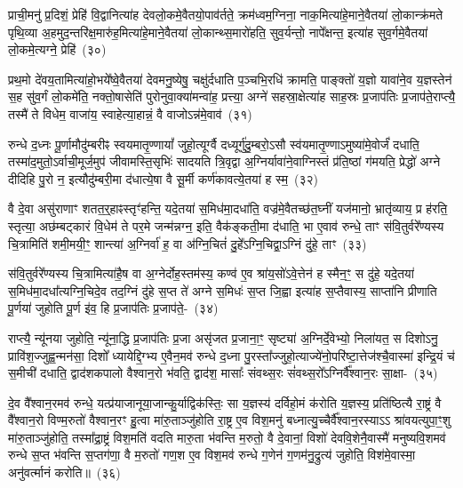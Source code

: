 {\anuvakamend[{प्रा॒णैः पोषो᳚\-ऽप्र॒त्याग्नी᳚ध्रे॒ पति॑मे॒ष दश॑ च}]}

प्राची॒मनु॑ प्र॒दिशं॒ प्रेहि॑ वि॒द्वानित्या॑ह देवलो॒कमे॒वैतयो॒पाव॑र्तते॒ क्रम॑ध्वम॒ग्निना॒ नाक॒मित्या॑हे॒माने॒वैतया॑ लो॒कान्क्र॑मते पृथि॒व्या अ॒हमुद॒न्तरि॑क्ष॒मारु॑ह॒मित्या॑हे॒माने॒वैतया॑ लो॒कान्थ्स॒मारो॑हति॒ सुव॒र्यन्तो॒ नापे᳚क्षन्त॒ इत्या॑ह सुव॒र्गमे॒वैतया॑ लो॒कमे॒त्यग्ने॒ प्रेहि॑~(३०)\ip

प्रथ॒मो दे॑वय॒तामित्या॑हो॒भये᳚ष्वे॒वैतया॑ देवमनु॒ष्येषु॒ चक्षु॑र्दधाति प॒ञ्चभि॒रधि॑ क्रामति॒ पाङ्क्तो॑ य॒ज्ञो यावा॑ने॒व य॒ज्ञस्तेन॑ स॒ह सु॑व॒र्गं लो॒कमे॑ति॒ नक्तो॒षासेति॑ पुरोनुवा॒क्या॑मन्वा॑ह॒ प्रत्त्या॒ अग्ने॑ सहस्रा॒क्षेत्या॑ह साह॒स्रः प्र॒जा\-प॑तिः प्र॒जा\-प॑ते॒राप्त्यै॒ तस्मै॑ ते विधेम॒ वाजा॑य॒ स्वाहेत्या॒हान्नं॒ वै वाजो\-ऽन्न॑मे॒वाव॑~(३१)\ip

रुन्धे द॒ध्नः पू॒र्णामौदु॑म्बरीꣴ स्वयमा\-तृ॒ण्णायां᳚ जुहो॒त्यूर्ग्वै दध्यूर्गु॑दु॒म्बरो॒\-ऽसौ स्व॑यमातृ॒ण्णा\-ऽमुष्या॑मे॒वोर्जं॑ दधाति॒ तस्मा॑द॒मुतो॒\-ऽर्वाची॒मूर्ज॒मुप॑ जीवामस्ति॒सृभिः॑ सादयति त्रि॒वृद्वा अ॒ग्निर्यावा॑ने॒वाग्निस्तं प्र॑ति॒ष्ठां ग॑मयति॒ प्रेद्धो॑ अग्ने दीदिहि पु॒रो न॒ इत्यौदु॑म्बरी॒मा द॑धात्ये॒षा वै सू॒र्मी कर्ण॑कावत्ये॒तया॑ ह स्म॒~(३२)\ip

वै दे॒वा असु॑राणाꣳ शतत॒र्॒\mbox{}हाꣴस्तृꣳ॑हन्ति॒ यदे॒तया॑ स॒मिध॑मा॒दधा॑ति॒ वज्र॑मे॒वैतच्छ॑त॒घ्नीं यज॑मानो॒ भ्रातृ॑व्याय॒ प्र ह॑रति॒ स्तृत्या॒ अछ॑म्बट्कारं वि॒धेम॑ ते पर॒मे जन्म॑न्नग्न॒ इति॒ वैक॑ङ्कती॒मा द॑धाति॒ भा ए॒वाव॑ रुन्धे॒ ताꣳ स॑वि॒तुर्वरे᳚ण्यस्य चि॒त्रामिति॑ शमी॒मयी॒ꣳ॒ शान्त्या॑ अ॒ग्निर्वा॑ ह॒ वा अ॑ग्नि॒चितं॑ दु॒हे᳚\-ऽग्नि॒चिद्वा॒\-ऽग्निं दु॑हे॒ ताꣳ~(३३)\ip

स॑वि॒तुर्वरे᳚ण्यस्य चि॒त्रामित्या॑है॒ष वा अ॒ग्नेर्दोह॒स्तम॑स्य॒ कण्व॑ ए॒व श्रा॑य॒सो॑\-ऽवे॒त्तेन॑ ह स्मैन॒ꣳ॒ स दु॑हे॒ यदे॒तया॑ स॒मिध॑मा॒दधा᳚त्यग्नि॒चिदे॒व तद॒ग्निं दु॑हे स॒प्त ते॑ अग्ने स॒मिधः॑ स॒प्त जि॒ह्वा इत्या॑ह स॒प्तैवास्य॒ साप्ता॑नि प्रीणाति पू॒र्णया॑ जुहोति पू॒र्ण इ॑व॒ हि प्र॒जा\-प॑तिः प्र॒जा\-प॑ते॒-~(३४)\ip

राप्त्यै॒ न्यू॑नया जुहोति॒ न्यू॑ना॒द्धि प्र॒जा\-प॑तिः प्र॒जा असृ॑जत प्र॒जाना॒ꣳ॒ सृष्ट्या॑ अ॒ग्निर्दे॒वेभ्यो॒ निला॑यत॒ स दिशो\-ऽनु॒ प्रावि॑श॒ज्जुह्व॒न्मन॑सा॒ दिशो᳚ ध्यायेद्दि॒ग्भ्य ए॒वैन॒मव॑ रुन्धे द॒ध्ना पु॒रस्ता᳚ज्जुहो॒त्याज्ये॑नो॒परि॑ष्टा॒त्तेज॑श्चै॒वास्मा॑ इन्द्रि॒यं च॑ स॒मीची॑ दधाति॒ द्वाद॑श\-कपालो वैश्वान॒रो भ॑वति॒ द्वाद॑श॒ मासाः᳚ संवथ्स॒रः सं॑वथ्स॒रो᳚\-ऽग्निर्वै᳚श्वान॒रः सा॒क्षा-~(३५)\ip

दे॒व वै᳚श्वान॒रमव॑ रुन्धे॒ यत्प्र॑याजानूया॒जान्कु॒र्याद्विक॑स्तिः॒ सा य॒ज्ञस्य॑ दर्विहो॒मं क॑रोति य॒ज्ञस्य॒ प्रति॑ष्ठित्यै रा॒ष्ट्रं वै वै᳚श्वान॒रो विण्म॒रुतो॑ वैश्वान॒रꣳ हु॒त्वा मा॑रु॒ताञ्जु॑होति रा॒ष्ट्र ए॒व विश॒मनु॑ बध्नात्यु॒च्चैर्वै᳚श्वान॒रस्याऽऽ श्रा॑वयत्युपा॒ꣳ॒शु मा॑रु॒ताञ्जु॑होति॒ तस्मा᳚द्\-रा॒ष्ट्रं विश॒मति॑ वदति मारु॒ता भ॑वन्ति म॒रुतो॒ वै दे॒वानां॒ विशो॑ देववि॒शेनै॒वास्मै॑ मनुष्यवि॒शमव॑ रुन्धे स॒प्त भ॑वन्ति स॒प्तग॑णा॒ वै म॒रुतो॑ गण॒श ए॒व विश॒मव॑ रुन्धे ग॒णेन॑ ग॒णम॑नु॒द्रुत्य॑ जुहोति॒ विश॑मे॒वास्मा॒ अनु॑वर्त्मानं करोति॥~(३६)\ip

